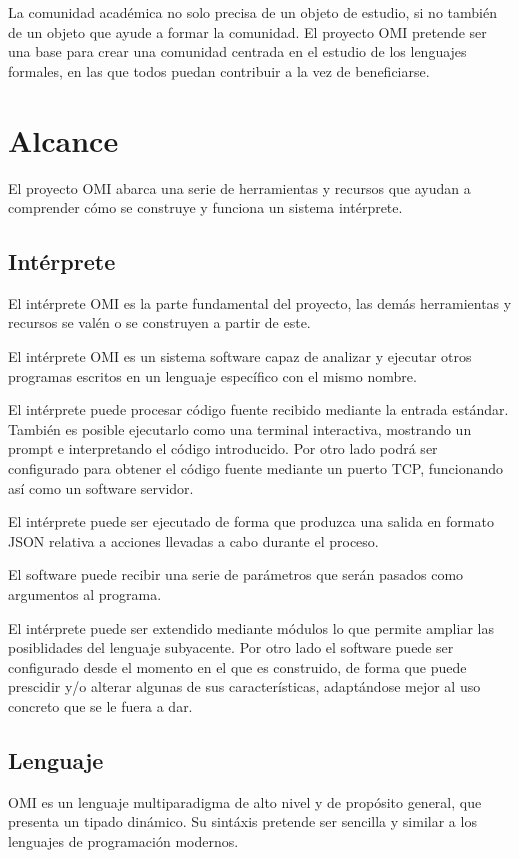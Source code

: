 La comunidad académica no solo precisa de un objeto de estudio, si no también de un objeto que ayude a formar la comunidad. El proyecto OMI pretende ser una base para crear una comunidad 
centrada en el estudio de los lenguajes formales, en las que todos puedan contribuir a la vez de beneficiarse.

\section{Alcance} 

El proyecto OMI abarca una serie de herramientas y recursos que ayudan a comprender 
cómo se construye y funciona un sistema intérprete.

\subsection{Intérprete}
El intérprete OMI es la parte fundamental del proyecto, las demás herramientas y recursos se valén o se construyen a partir de este. 

El intérprete OMI es un sistema software capaz de analizar y ejecutar otros programas escritos en un lenguaje específico con el mismo nombre.

El intérprete puede procesar código fuente recibido mediante la entrada estándar. También es posible ejecutarlo como una terminal interactiva, mostrando un prompt
e interpretando el código introducido. Por otro lado podrá ser configurado para obtener el código fuente mediante un puerto TCP, funcionando así como un software 
servidor. 

El intérprete puede ser ejecutado de forma que produzca una salida en formato JSON relativa a acciones llevadas a cabo durante el proceso.

El software puede recibir una serie de parámetros que serán pasados como argumentos al programa.  

El intérprete puede ser extendido mediante módulos lo que permite ampliar las posiblidades del lenguaje subyacente. Por otro lado el software 
puede ser configurado desde el momento en el que es construido, de forma que puede prescidir y/o alterar algunas de sus características, adaptándose mejor 
al uso concreto que se le fuera a dar. 

\subsection{Lenguaje} 
OMI es un lenguaje multiparadigma de alto nivel y de propósito general, que presenta un tipado dinámico. Su sintáxis pretende 
ser sencilla y similar a los lenguajes de programación modernos. 

